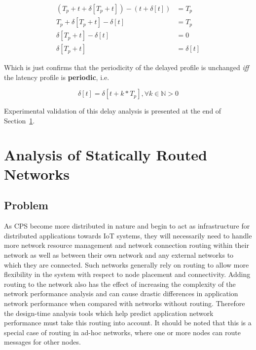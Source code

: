 \begin{equation}
  \begin{split}
    (T_p + t + \delta[T_p + t]) - (t + \delta[t]) &= T_p \\
    T_p + \delta[T_p + t] - \delta[t] &= T_p \\
    \delta[T_p + t] - \delta[t] &= 0\\
    \delta[T_p + t] &= \delta[t]
  \end{split}
\end{equation}

Which is just confirms that the periodicity of the delayed profile is
unchanged \emph{iff} the latency profile is \textbf{periodic}, i.e.

\begin{equation}
\delta[t] = \delta[t + k*T_p], \forall k\in\mathbb{N} > 0
\end{equation}

Experimental validation of this delay analysis is presented at the end
of Section~\ref{sec:routing}.

\newpage

\section{Analysis of Statically Routed Networks}
\label{sec:routing}

\subsection{Problem}
As CPS become more distributed in nature and begin to act as
infrastructure for distributed applications towards IoT systems, they
will necessarily need to handle more network resource management and
network connection routing within their network as well as between
their own network and any external networks to which they are
connected.  Such networks generally rely on routing to allow more
flexibility in the system with respect to node placement and
connectivity.  Adding routing to the network also has the effect of
increasing the complexity of the network performance analysis and can
cause drastic differences in application network performance when
compared with networks without routing.  Therefore the design-time
analysis tools which help predict application network performance must
take this routing into account.  It should be noted that this is a
special case of routing in ad-hoc networks, where one or more nodes
can route messages for other nodes.

